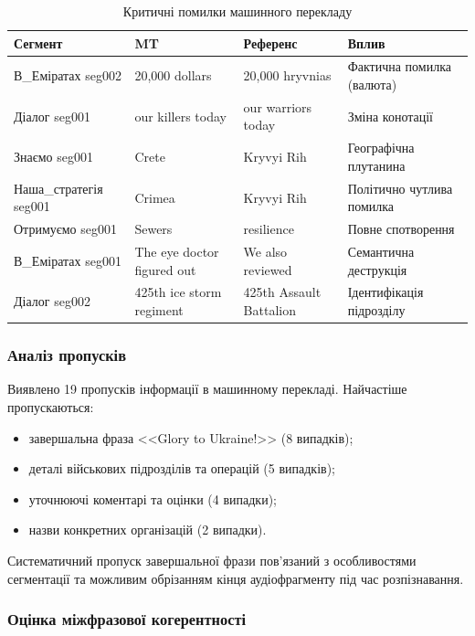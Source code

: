 \begin{table}[H]
\centering
\caption{Критичні помилки машинного перекладу}
\label{tab:critical_errors}
\small
\begin{tabular}{|p{2.5cm}|p{4cm}|p{4cm}|p{3cm}|}
\hline
\textbf{Сегмент} & \textbf{MT} & \textbf{Референс} & \textbf{Вплив} \\
\hline
В\_Еміратах seg002 & 20,000 dollars & 20,000 hryvnias & Фактична помилка (валюта) \\
\hline
Діалог seg001 & our killers today & our warriors today & Зміна конотації \\
\hline
Знаємо seg001 & Crete & Kryvyi Rih & Географічна плутанина \\
\hline
Наша\_стратегія seg001 & Crimea & Kryvyi Rih & Політично чутлива помилка \\
\hline
Отримуємо seg001 & Sewers & resilience & Повне спотворення \\
\hline
В\_Еміратах seg001 & The eye doctor figured out & We also reviewed & Семантична деструкція \\
\hline
Діалог seg002 & 425th ice storm regiment & 425th Assault Battalion & Ідентифікація підрозділу \\
\hline
\end{tabular}
\end{table}

\subsubsection{Аналіз пропусків}

Виявлено 19 пропусків інформації в машинному перекладі. Найчастіше пропускаються:
\begin{itemize}[nosep]
    \item завершальна фраза <<Glory to Ukraine!>> (8 випадків);
    \item деталі військових підрозділів та операцій (5 випадків);
    \item уточнюючі коментарі та оцінки (4 випадки);
    \item назви конкретних організацій (2 випадки).
\end{itemize}

Систематичний пропуск завершальної фрази пов'язаний з особливостями сегментації
та можливим обрізанням кінця аудіофрагменту під час розпізнавання.

\subsubsection{Оцінка міжфразової когерентності}

